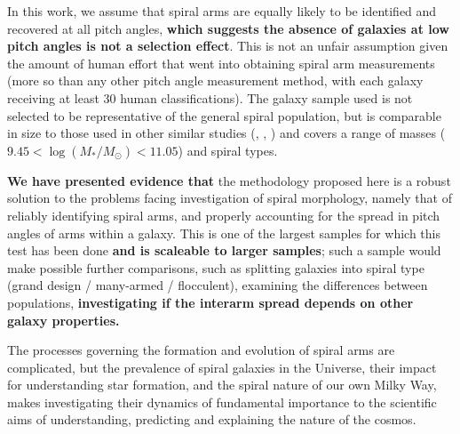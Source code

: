 In this work, we assume that spiral arms are equally likely to be identified and recovered at all pitch angles, \textbf{which suggests the absence of galaxies at low pitch angles is not a selection effect}. This is not an unfair assumption given the amount of human effort that went into obtaining spiral arm measurements (more so than any other pitch angle measurement method, with each galaxy receiving at least 30 human classifications). The galaxy sample used is not selected to be representative of the general spiral population, but is comparable in size to those used in other similar studies (\citealt{2013MNRAS.436.1074S}, \citealt{2019ApJ...871..194Y}, \citealt{2019arXiv190910291P}) and covers a range of masses ($9.45 < \log(M_* / M_\odot) < 11.05$) and spiral types.

\textbf{We have presented evidence that} the methodology proposed here is a robust solution to the problems facing investigation of spiral morphology, namely that of reliably identifying spiral arms, and properly accounting for the spread in pitch angles of arms within a galaxy. This is one of the largest samples for which this test has been done \textbf{and is scaleable to larger samples}; such a sample would make possible further comparisons, such as splitting galaxies into spiral type (grand design / many-armed / flocculent), examining the differences between populations, \textbf{investigating if the interarm spread depends on other galaxy properties.}

The processes governing the formation and evolution of spiral arms are complicated, but the prevalence of spiral galaxies in the Universe, their impact for understanding star formation, and the spiral nature of our own Milky Way, makes investigating their dynamics of fundamental importance to the scientific aims of understanding, predicting and explaining the nature of the cosmos.
